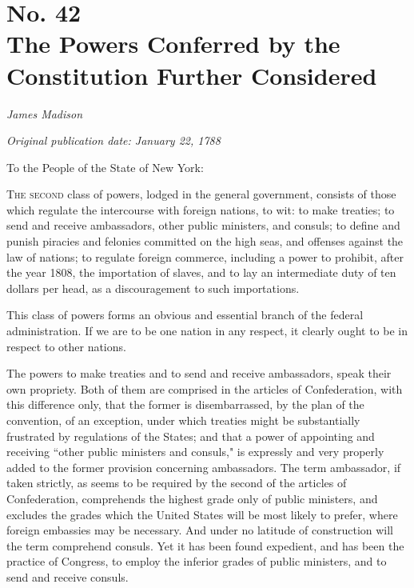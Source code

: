 \chapter[No. 42: The Powers Conferred by the Constitution Further Considered]{No. 42\\ {\small The Powers Conferred by the Constitution Further Considered}}

\textit{James Madison}

\textit{Original publication date: January 22, 1788}
\vspace{1cm}

To the People of the State of New York:
\vspace{.4cm}

\textsc{The second} class of powers, lodged in the general government, consists of those which regulate the intercourse with foreign nations, to wit: to make treaties; to send and receive ambassadors, other public ministers, and consuls; to define and punish piracies and felonies committed on the high seas, and offenses against the law of nations; to regulate foreign commerce, including a power to prohibit, after the year 1808, the importation of slaves, and to lay an intermediate duty of ten dollars per head, as a discouragement to such importations.

This class of powers forms an obvious and essential branch of the federal administration. 
If we are to be one nation in any respect, it clearly ought to be in respect to other nations.

The powers to make treaties and to send and receive ambassadors, speak their own propriety. 
Both of them are comprised in the articles of Confederation, with this difference only, that the former is disembarrassed, by the plan of the convention, of an exception, under which treaties might be substantially frustrated by regulations of the States; and that a power of appointing and receiving ``other public ministers and consuls," is expressly and very properly added to the former provision concerning ambassadors. 
The term ambassador, if taken strictly, as seems to be required by the second of the articles of Confederation, comprehends the highest grade only of public ministers, and excludes the grades which the United States will be most likely to prefer, where foreign embassies may be necessary. 
And under no latitude of construction will the term comprehend consuls. 
Yet it has been found expedient, and has been the practice of Congress, to employ the inferior grades of public ministers, and to send and receive consuls.

